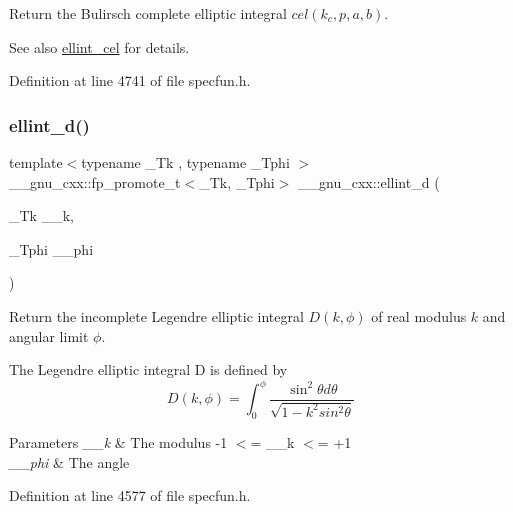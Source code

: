 Return the Bulirsch complete elliptic integral $ cel(k_c,p,a,b) $.

\begin{DoxySeeAlso}{See also}
\hyperlink{group__gnu__math__spec__func_ga6e44a0d90500e56ef4b3aba6efd7e2b0}{ellint\+\_\+cel} for details. 
\end{DoxySeeAlso}


Definition at line 4741 of file specfun.\+h.

\mbox{\label{group__gnu__math__spec__func_gad75103894786e6d7766bac4d8447b6cc}} 
\subsubsection{\texorpdfstring{ellint\+\_\+d()}{ellint\_d()}}
{\footnotesize\ttfamily template$<$typename \+\_\+\+Tk , typename \+\_\+\+Tphi $>$ \\
\+\_\+\+\_\+gnu\+\_\+cxx\+::fp\+\_\+promote\+\_\+t$<$\+\_\+\+Tk, \+\_\+\+Tphi$>$ \+\_\+\+\_\+gnu\+\_\+cxx\+::ellint\+\_\+d (\begin{DoxyParamCaption}\item[{\+\_\+\+Tk}]{\+\_\+\+\_\+k,  }\item[{\+\_\+\+Tphi}]{\+\_\+\+\_\+phi }\end{DoxyParamCaption})\hspace{0.3cm}{\ttfamily [inline]}}

Return the incomplete Legendre elliptic integral $ D(k,\phi) $ of real modulus $ k $ and angular limit $ \phi $.

The Legendre elliptic integral D is defined by \[ D(k,\phi) = \int_0^\phi \frac{\sin^2\theta d\theta}{\sqrt{1-k^2sin^2\theta}} \]


\begin{DoxyParams}{Parameters}
{\em \+\_\+\+\_\+k} & The modulus {\ttfamily -\/1 $<$= \+\_\+\+\_\+k $<$= +1} \\
\hline
{\em \+\_\+\+\_\+phi} & The angle \\
\hline
\end{DoxyParams}


Definition at line 4577 of file specfun.\+h.

\mbox{\label{group__gnu__math__spec__func_ga02ed50be21fdd84ad6bed003f94a9e69}} 
